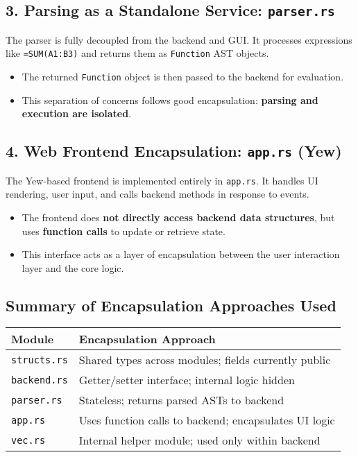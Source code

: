\documentclass{article}
\begin{document}
\subsection*{3. Parsing as a Standalone Service: \texttt{parser.rs}}
The parser is fully decoupled from the backend and GUI. It processes expressions like \texttt{=SUM(A1:B3)} and returns them as \texttt{Function} AST objects.
\begin{itemize}
    \item The returned \texttt{Function} object is then passed to the backend for evaluation.
    \item This separation of concerns follows good encapsulation: \textbf{parsing and execution are isolated}.
\end{itemize}

\subsection*{4. Web Frontend Encapsulation: \texttt{app.rs} (Yew)}
The Yew-based frontend is implemented entirely in \texttt{app.rs}. It handles UI rendering, user input, and calls backend methods in response to events.
\begin{itemize}
    \item The frontend does \textbf{not directly access backend data structures}, but uses \textbf{function calls} to update or retrieve state.
    \item This interface acts as a layer of encapsulation between the user interaction layer and the core logic.
\end{itemize}

\subsection*{Summary of Encapsulation Approaches Used}

\begin{tabular}{|l|l|}
\hline
\textbf{Module} & \textbf{Encapsulation Approach} \\
\hline
\texttt{structs.rs} & Shared types across modules; fields currently public \\
\texttt{backend.rs} & Getter/setter interface; internal logic hidden \\
\texttt{parser.rs} & Stateless; returns parsed ASTs to backend \\
\texttt{app.rs} & Uses function calls to backend; encapsulates UI logic \\
\texttt{vec.rs} & Internal helper module; used only within backend \\
\hline
\end{tabular}
\end{document}
